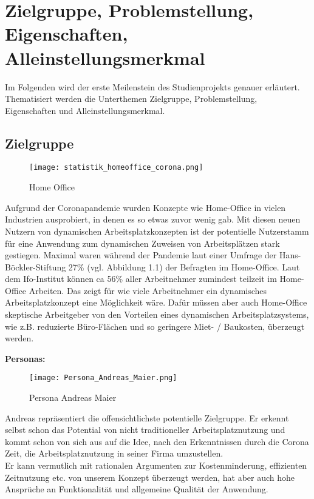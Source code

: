 \chapter{Zielgruppe, Problemstellung, Eigenschaften, Alleinstellungsmerkmal}

Im Folgenden wird der erste Meilenstein des Studienprojekts genauer erläutert. 
Thematisiert werden die Unterthemen Zielgruppe, Problemstellung, Eigenschaften und Alleinstellungsmerkmal.

\section{Zielgruppe}

\begin{figure}[!h]
    \centering
    \texttt{[image: statistik\_homeoffice\_corona.png]}
    \caption{Home Office}
    \label{fig:HomeOffice}
\end{figure}

Aufgrund der Coronapandemie wurden Konzepte wie Home-Office in vielen Industrien ausprobiert, in denen es so etwas zuvor wenig gab.
Mit diesen neuen Nutzern von dynamischen Arbeitsplatzkonzepten ist der potentielle Nutzerstamm für eine Anwendung zum dynamischen Zuweisen von Arbeitsplätzen stark gestiegen.
Maximal waren während der Pandemie laut einer Umfrage der Hans-Böckler-Stiftung 27\% (vgl. Abbildung 1.1) der Befragten im Home-Office.
Laut dem Ifo-Institut können ca 56\% aller Arbeitnehmer zumindest teilzeit im Home-Office Arbeiten. 
Das zeigt für wie viele Arbeitnehmer ein dynamisches Arbeitsplatzkonzept eine Möglichkeit wäre.
Dafür müssen aber auch Home-Office skeptische Arbeitgeber von den Vorteilen eines dynamischen Arbeitsplatzsystems, wie z.B. reduzierte Büro-Flächen und so geringere Miet- / Baukosten, überzeugt werden.

\textbf{Personas: }

\begin{figure}[!h]
    \centering
    \texttt{[image: Persona\_Andreas\_Maier.png]}
    \caption{Persona Andreas Maier}
    \label{fig:PersonaAndreasMaier}
\end{figure}

Andreas repräsentiert die offensichtlichste potentielle Zielgruppe.
Er erkennt selbst schon das Potential von nicht traditioneller Arbeitsplatznutzung und kommt schon von sich aus auf die Idee, nach den Erkenntnissen durch die Corona Zeit, die Arbeitsplatznutzung in seiner Firma umzustellen.\\
Er kann vermutlich mit rationalen Argumenten zur Kostenminderung, effizienten Zeitnutzung etc. von unserem Konzept überzeugt werden, hat aber auch hohe Ansprüche an Funktionalität und allgemeine Qualität der Anwendung.

